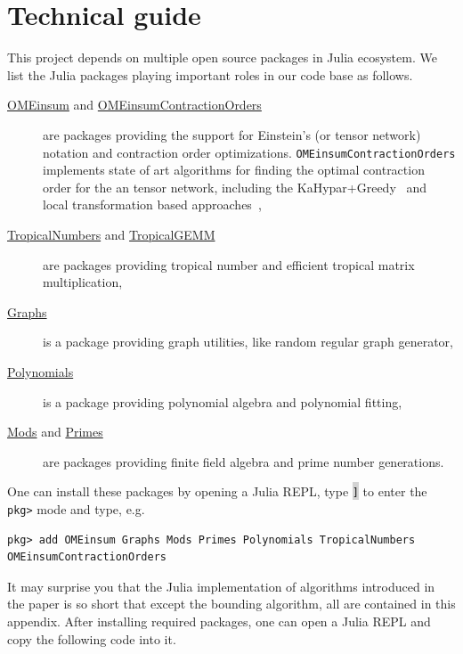 \documentclass[onefignum, onetabnum]{siamart190516}
\newcommand{\<}{\langle}
\renewcommand{\>}{\rangle}
\begin{document}



\appendix

\section{Technical guide}\label{sec:technical}
This project depends on multiple open source packages in Julia ecosystem.
We list the Julia packages playing important roles in our code base as follows.

\begin{description}
	\item[\href{https://github.com/under-Peter/OMEinsum.jl}{OMEinsum} and \href{https://github.com/Happy-Diode/OMEinsumContractionOrders.jl}{OMEinsumContractionOrders}] are packages providing the support for Einstein's (or tensor network) notation and contraction order optimizations.
    \texttt{OMEinsumContractionOrders} implements state of art algorithms for finding the optimal contraction order for the an tensor network, including the KaHypar+Greedy~\cite{Gray2021, Pan2021} and local transformation based approaches~\cite{Kalachev2021},
	\item[\href{https://github.com/TensorBFS/TropicalNumbers.jl}{TropicalNumbers} and \href{https://github.com/TensorBFS/TropicalGEMM.jl}{TropicalGEMM}] are packages providing tropical number and efficient tropical matrix multiplication,
	\item[\href{https://github.com/JuliaGraphs/Graphs.jl}{Graphs}] is a package providing graph utilities, like random regular graph generator,
	\item[\href{https://github.com/JuliaMath/Polynomials.jl}{Polynomials}] is a package providing polynomial algebra and polynomial fitting,
	\item[\href{https://github.com/scheinerman/Mods.jl}{Mods} and \href{https://github.com/JuliaMath/Primes.jl}{Primes}] are packages providing finite field algebra and prime number generations.
\end{description}

One can install these packages by opening a Julia REPL, type \colorbox{lightgray}{\texttt{]}} to enter the \texttt{pkg>} mode and type, e.g.
\begin{lstlisting}
pkg> add OMEinsum Graphs Mods Primes Polynomials TropicalNumbers OMEinsumContractionOrders
\end{lstlisting}

It may surprise you that the Julia implementation of algorithms introduced in the paper is so short that except the bounding algorithm,
all are contained in this appendix. After installing required packages, one can open a Julia REPL and copy the following code into it.
\end{document}
